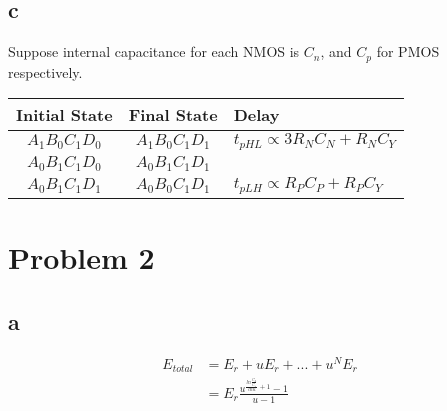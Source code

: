 \documentclass[a4paper,10pt]{article}
\begin{document}
\subsection*{c}
Suppose internal capacitance for each NMOS is \begin{math}C_n\end{math}, and \begin{math}C_p\end{math} for PMOS respectively.\\
\begin{tabular}{|c|c|l|}
 \hline
 Initial State&Final State&Delay\\ \hline
 \begin{math}A_1 B_0 C_1 D_0\end{math} & \begin{math}A_1 B_0 C_1 D_1\end{math} & \begin{math}t_{pHL}\propto 3R_N C_N + R_N C_Y\end{math}\\ \cline{1-2}
 \begin{math}A_0 B_1 C_1 D_0\end{math} & \begin{math}A_0 B_1 C_1 D_1\end{math} &\\ \hline
 \begin{math}A_0 B_1 C_1 D_1\end{math} & \begin{math}A_0 B_0 C_1 D_1\end{math} & \begin{math}t_{pLH}\propto R_P C_P + R_P C_Y\end{math}\\ \hline
\end{tabular}
\section*{Problem 2}
\subsection*{a}
\begin{equation}
\begin{split}
 E_{total} &= E_r + uE_r + ... + u^N E_r\\
 &= E_r \frac{u^{\frac{ln\frac{C_L}{C_1}}{ln u} + 1} - 1}{u-1}
\end{split}
\end{equation}
\end{document}
